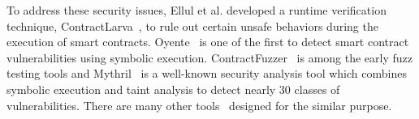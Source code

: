 %
To address these security issues, Ellul et al. developed a runtime verification technique,
ContractLarva~\cite{ellul2018runtime}, to rule out certain unsafe behaviors during the execution of
smart contracts.
Oyente~\cite{oyente,luu2016making} is one of the first to detect smart contract vulnerabilities
using symbolic execution.
ContractFuzzer~\cite{jiang2018contractfuzzer} is among the early fuzz testing tools and
Mythril~\cite{mythril} is a well-known security analysis tool which combines symbolic execution and
taint analysis to detect nearly 30 classes of vulnerabilities.
There are many other
tools~\cite{kalra2018zeus,SmartCheck,securify,tsankov2018securify,chang2018scompile,wang2019vultron,Wang2019b}
designed for the similar purpose.



